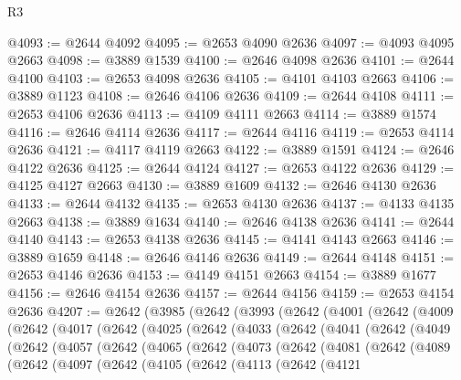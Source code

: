 \begin{lexlean}{R3}
\begin{coremodule}
@4093 := @2644 @4092
@4095 := @2653 @4090 @2636
@4097 := @4093 @4095 @2663
@4098 := @3889 @1539
@4100 := @2646 @4098 @2636
@4101 := @2644 @4100
@4103 := @2653 @4098 @2636
@4105 := @4101 @4103 @2663
@4106 := @3889 @1123
@4108 := @2646 @4106 @2636
@4109 := @2644 @4108
@4111 := @2653 @4106 @2636
@4113 := @4109 @4111 @2663
@4114 := @3889 @1574
@4116 := @2646 @4114 @2636
@4117 := @2644 @4116
@4119 := @2653 @4114 @2636
@4121 := @4117 @4119 @2663
@4122 := @3889 @1591
@4124 := @2646 @4122 @2636
@4125 := @2644 @4124
@4127 := @2653 @4122 @2636
@4129 := @4125 @4127 @2663
@4130 := @3889 @1609
@4132 := @2646 @4130 @2636
@4133 := @2644 @4132
@4135 := @2653 @4130 @2636
@4137 := @4133 @4135 @2663
@4138 := @3889 @1634
@4140 := @2646 @4138 @2636
@4141 := @2644 @4140
@4143 := @2653 @4138 @2636
@4145 := @4141 @4143 @2663
@4146 := @3889 @1659
@4148 := @2646 @4146 @2636
@4149 := @2644 @4148
@4151 := @2653 @4146 @2636
@4153 := @4149 @4151 @2663
@4154 := @3889 @1677
@4156 := @2646 @4154 @2636
@4157 := @2644 @4156
@4159 := @2653 @4154 @2636
@4207 := @2642
    (@3985
      (@2642
        (@3993
          (@2642
            (@4001
              (@2642
                (@4009
                  (@2642
                    (@4017
                      (@2642
                        (@4025
                          (@2642
                            (@4033
                              (@2642
                                (@4041
                                  (@2642
                                    (@4049
                                      (@2642
                                        (@4057
                                          (@2642
                                            (@4065
                                              (@2642
                                                (@4073
                                                  (@2642
                                                    (@4081
                                                      (@2642
                                                        (@4089
                                                          (@2642
                                                            (@4097
                                                              (@2642
                                                                (@4105
                                                                  (@2642
                                                                    (@4113
                                                                      (@2642
                                                                        (@4121

\end{coremodule}
\end{lexlean}
